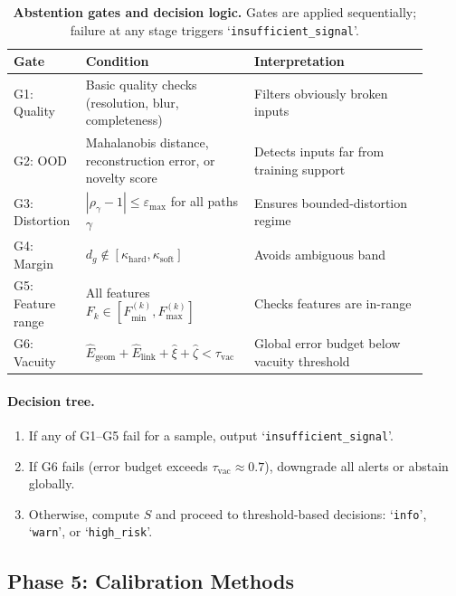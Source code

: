 \documentclass[11pt]{article}
\begin{document}
\begin{table}[H]
\centering
\caption{\textbf{Abstention gates and decision logic.} Gates are applied sequentially; failure at any stage triggers `\texttt{insufficient\_signal}'.}
\label{tab:abstention-gates}
\begin{tabularx}{\linewidth}{@{}p{0.16\linewidth}p{0.35\linewidth}p{0.40\linewidth}@{}}
\toprule
\textbf{Gate} & \textbf{Condition} & \textbf{Interpretation} \\
\midrule
G1: Quality & Basic quality checks (resolution, blur, completeness) & Filters obviously broken inputs \\
\addlinespace[2pt]
G2: OOD & Mahalanobis distance, reconstruction error, or novelty score & Detects inputs far from training support \\
\addlinespace[2pt]
G3: Distortion & $|\rho_\gamma - 1| \le \varepsilon_{\max}$ for all paths $\gamma$ & Ensures bounded-distortion regime \\
\addlinespace[2pt]
G4: Margin & $d_g \notin [\kappa_{\mathrm{hard}}, \kappa_{\mathrm{soft}}]$ & Avoids ambiguous band \\
\addlinespace[2pt]
G5: Feature range & All features $F_k \in [F_{\min}^{(k)}, F_{\max}^{(k)}]$ & Checks features are in-range \\
\addlinespace[2pt]
G6: Vacuity & $\hat E_{\mathrm{geom}} + \hat E_{\mathrm{link}} + \hat\xi + \hat\zeta < \tau_{\mathrm{vac}}$ & Global error budget below vacuity threshold \\
\bottomrule
\end{tabularx}
\end{table}

\paragraph{Decision tree.}
\begin{enumerate}[label=\arabic*.,leftmargin=*]
  \item If any of G1--G5 fail for a sample, output `\texttt{insufficient\_signal}'.
  \item If G6 fails (error budget exceeds $\tau_{\mathrm{vac}} \approx 0.7$), downgrade all alerts or abstain globally.
  \item Otherwise, compute $S$ and proceed to threshold-based decisions: `\texttt{info}', `\texttt{warn}', or `\texttt{high\_risk}'.
\end{enumerate}

\subsection{Phase 5: Calibration Methods}
\label{subsec:calibration-methods}
\end{document}
